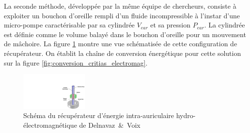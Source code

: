 La seconde méthode, développée par la même équipe de chercheurs, consiste à exploiter un bouchon d'oreille rempli d'un fluide incompressible à l'instar d'une micro-pompe caractérisable par sa cylindrée $V_{ear}$ et sa pression $P_{ear}$. La cylindrée est définie comme le volume balayé dans le bouchon d'oreille pour un mouvement de mâchoire. La figure \ref{fig:Critias_electromag_schema} montre une vue schématisée de cette configuration de récupérateur. On établit la chaîne de conversion énergétique pour cette solution sur la figure \ref{fig:conversion_critias_electromag}.
\begin{figure}[!htbp]
\begin{center}
    \captionsetup{justification=centering}
	\includegraphics[trim={21cm 0cm 0cm 6cm},clip, width=0.3\textwidth]{../Chap2/Figure/Critias_electromag.pdf}
	\caption{Schéma du récupérateur d'énergie intra-auriculaire hydro-électromagnétique de \mbox{Delnavaz \& Voix \cite{Delnavaz2014}}}
	\label{fig:Critias_electromag_schema}
\end{center}
\end{figure}

